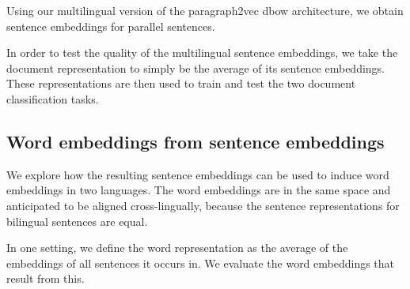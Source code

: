 Using our multilingual version of the paragraph2vec dbow architecture, we obtain sentence embeddings for parallel sentences. 




In order to test the quality of the multilingual sentence embeddings, we take the document representation to simply be the average of its sentence embeddings. These representations are then used to train and test the two document classification tasks.


\subsection{Word embeddings from sentence embeddings}
We explore how the resulting sentence embeddings can be used to induce word embeddings in two languages. The word embeddings are in the same space and anticipated to be aligned cross-lingually, because the sentence representations for bilingual sentences are equal.

In one setting, we define the word representation as the average of the embeddings of all sentences it occurs in. We evaluate the word embeddings that result from this.



